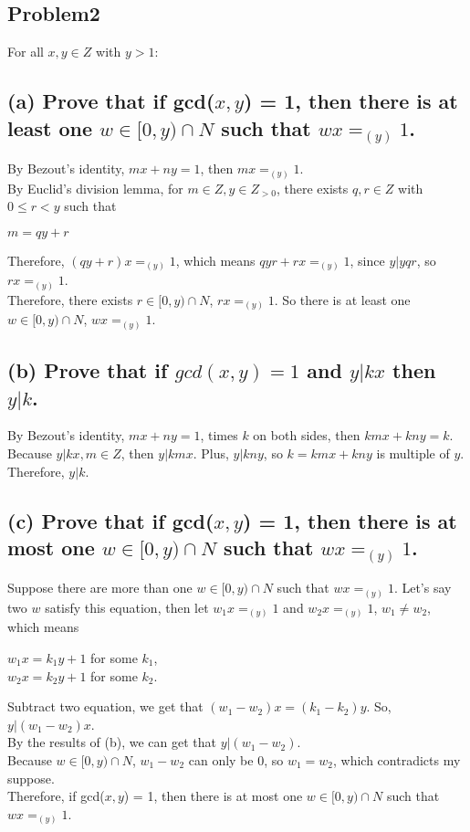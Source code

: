 \documentclass[]{article}
\begin{document}
\begin{spacing}{1.5}
\section*{Problem2}
For all $ x, y \in Z $ with $ y > 1 :$
\subsection*{(a) Prove that if gcd($x, y $) = 1, then there is at least one $ w \in  [0, y) \cap N$ such that $ wx = _{(y)}1 $.}

By Bezout's identity, $ mx+ny=1 $, then $ mx = _{(y)}1$.\\
By Euclid's division lemma, for $ m \in Z, y \in Z_{>0} $, there exists $ q, r \in Z $ with $ 0 \leq r < y $ such that
\begin{center}
	$ m = qy + r $
\end{center}
Therefore, $ (qy + r)x  = _{(y)}1$, which means $  qyr + rx  = _{(y)}1$, since $ y | yqr $, so $ rx  = _{(y)}1 $.\\
Therefore, there exists $ r \in  [0, y) \cap N $, $ rx  = _{(y)}1 $.
So there is at least one $ w \in  [0, y) \cap N $, $ wx  = _{(y)}1 $.

\subsection*{(b) Prove that if $ gcd(x, y) = 1 $ and $ y|kx $ then $ y|k $.}
By Bezout's identity, $ mx+ny=1 $, times $ k $ on both sides, then $ kmx + kny = k$.\\
Because $ y|kx, m \in Z$, then $ y|kmx $. Plus, $ y|kny $, so $ k = kmx+kny $ is multiple of $ y $.\\
Therefore, $ y|k $.

\subsection*{(c) Prove that if gcd($x, y $) = 1, then there is at most one $ w \in  [0, y) \cap N$ such that $ wx = _{(y)}1 $.}
Suppose there are more than one $ w \in  [0, y) \cap N$ such that $ wx = _{(y)}1 $. Let's say two $ w $ satisfy this equation, then let $ w_1x = _{(y)}1 $ and $ w_2x = _{(y)}1 $, $ w_1 \neq w_2 $, which means 
\begin{center}
	$ w_1x = k_1y+1 $ for some $ k_1 $,\\
	$ w_2x = k_2y+1 $ for some $ k_2 .$
\end{center}
Subtract two equation, we get that $ (w_1 - w_2)x = (k_1 - k_2)y $. So, $ y|(w_1-w_2)x $.\\
By the results of (b), we can get that $ y|(w_1-w_2) $.\\
Because  $ w \in  [0, y) \cap N$, $ w_1-w_2 $ can only be $ 0 $, so $ w_1 = w_2 $, which contradicts my suppose.\\
Therefore,  if gcd($x, y $) = 1, then there is at most one $ w \in  [0, y) \cap N$ such that $ wx = _{(y)}1 $.


\end{spacing}
\end{document}
